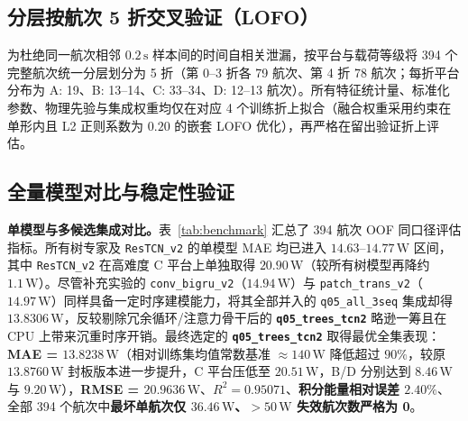 \documentclass[UTF8,a4paper,11pt,fontset=windows]{ctexart}
\newcommand{\W}{\,\mathrm{W}}
\newcommand{\code}[1]{\texttt{#1}}
\begin{document}
\subsection{分层按航次 5 折交叉验证（LOFO）}

为杜绝同一航次相邻 $0.2\,\mathrm{s}$ 样本间的时间自相关泄漏，按平台与载荷等级将 394 个完整航次统一分层划分为 5 折（第 0--3 折各 79 航次、第 4 折 78 航次；每折平台分布为 A: 19、B: 13--14、C: 33--34、D: 12--13 航次）。所有特征统计量、标准化参数、物理先验与集成权重均仅在对应 4 个训练折上拟合（融合权重采用约束在单形内且 L2 正则系数为 $0.20$ 的嵌套 LOFO 优化），再严格在留出验证折上评估。

\subsection{全量模型对比与稳定性验证}

\textbf{单模型与多候选集成对比。}表~\ref{tab:benchmark} 汇总了 394 航次 OOF 同口径评估指标。所有树专家及 \code{ResTCN\_v2} 的单模型 MAE 均已进入 $14.63\text{--}14.77\W$ 区间，其中 \code{ResTCN\_v2} 在高难度 C 平台上单独取得 $20.90\W$（较所有树模型再降约 $1.1\W$）。尽管补充实验的 \code{conv\_bigru\_v2}（$14.94\W$）与 \code{patch\_trans\_v2}（$14.97\W$）同样具备一定时序建模能力，将其全部并入的 \code{q05\_all\_3seq} 集成却得 $13.8306\W$，反较剔除冗余循环/注意力骨干后的 \textbf{\texttt{q05\_trees\_tcn2}} 略逊一筹且在 CPU 上带来沉重时序开销。最终选定的 \textbf{\texttt{q05\_trees\_tcn2}} 取得最优全集表现：\textbf{MAE = $13.8238\W$}（相对训练集均值常数基准 $\approx 140\W$ 降低超过 $90\%$，较原 $13.8760\W$ 封板版本进一步提升，C 平台压低至 $20.51\W$，B/D 分别达到 $8.46\W$ 与 $9.20\W$），\textbf{RMSE = $20.9636\W$}、\textbf{$R^2 = 0.95071$}、\textbf{积分能量相对误差 $2.40\%$}、全部 394 个航次中\textbf{最坏单航次仅 $36.46\W$、$>50\W$ 失效航次数严格为 0}。
\end{document}
